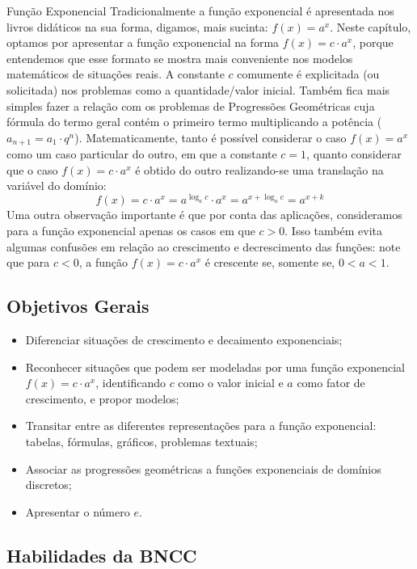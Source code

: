 \begin{apresentacao}{Função Exponencial}
Tradicionalmente a função exponencial é apresentada nos livros didáticos na sua forma, digamos, mais sucinta: $f(x)=a^x$. Neste capítulo, optamos por apresentar a função exponencial na forma $f(x) = c \cdot a^x$, porque entendemos que esse formato se mostra mais conveniente nos modelos matemáticos de situações reais. A constante $c$ comumente é explicitada (ou solicitada) nos problemas como a quantidade/valor inicial. Também fica mais simples fazer a relação com os problemas de Progressões Geométricas cuja fórmula do termo geral contém o primeiro termo multiplicando a potência ($a_{n+1}=a_1\cdot q^n$). 
Matematicamente, tanto é possível considerar o caso $f(x)=a^x$ como um caso particular do outro, em que a constante $c=1$, quanto considerar que o caso $f(x)=c\cdot a^x$ é obtido do outro realizando-se uma translação na variável do domínio:
\[
f(x)=c\cdot a^x = a^{\log_a c} \cdot a^x = a^{x + \log_a c}=a^{x+k}
\]
Uma outra observação importante é que por conta das aplicações, consideramos para a função exponencial apenas os casos em que $c>0$. Isso também evita algumas confusões em relação ao crescimento e decrescimento das funções: note que para $c<0$, a função $f(x)=c\cdot a^x$ é crescente se, somente se, $0<a<1$.

\subsection*{Objetivos Gerais}

\begin{itemize}
\item {} Diferenciar situações de crescimento e decaimento exponenciais;

\item {} Reconhecer situações que podem ser modeladas por uma função exponencial $f(x)=c \cdot a^{x}$, identificando $c$ como o valor inicial e $a$ como fator de crescimento, e propor modelos;

\item {} Transitar entre as diferentes representações para a função exponencial: tabelas, fórmulas, gráficos, problemas textuais;

\item {} Associar as progressões geométricas a funções exponenciais de domínios discretos;

\item {} Apresentar o número $e$.
\end{itemize}

\subsection*{Habilidades da BNCC}


\end{apresentacao}
